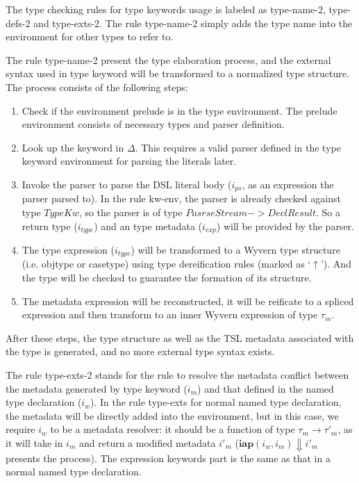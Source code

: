 \documentclass{sig-alternate}
\begin{document}
The type checking rules for type keywords usage is labeled as type-name-2, type-defs-2 and type-exts-2. The rule type-name-2 simply adds the type name into the environment for other types to refer to.

The rule type-name-2 present the type elaboration process, and the external syntax used in type keyword will be transformed to a normalized type structure. The process consists of the following steps:
\begin{enumerate}\setlength{\itemsep}{0pt}
\item Check if the environment prelude is in the type environment. The prelude environment consists of necessary types and parser definition. 
\item Look up the keyword in $\Delta$. This requires a valid parser defined in the type keyword environment for parsing the literals later.
\item Invoke the parser to parse the DSL literal body ($i_{ps}$, as an expression the parser parsed to). In the rule kw-env, the parser is already checked against type $TypeKw$, so the parser is of type $PasrseStream->DeclResult$. So a return type ($i_{type}$) and an type metadata ($i_{exp}$) will be provided by the parser.
\item The type expression ($i_{type}$) will be transformed to a Wyvern type structure (i.e. objtype or casetype) using type dereification rules (marked as `$\uparrow$'). And the type will be checked to guarantee the formation of its structure.
\item The metadata expression will be reconstructed, it will be reificate to a spliced expression and then transform to an inner Wyvern expression of type $\tau_m$. 
\end{enumerate} 
After these steps, the type structure as well as the TSL metadata associated with the type is generated, and no more external type syntax exists.

The rule type-exts-2 stands for the rule to resolve the metadata conflict between the metadata generated by type keyword ($i_m$) and that defined in the named type declaration ($i_w$). In the rule type-exts for normal named type declaration, the metadata will be directly added into the environment, but in this case, we require $i_w$ to be a metadata resolver: it should be a function of type $\tau_m\rightarrow\tau'_m$, as it will take in $i_m$ and return a modified metadata $i'_m$ ($\mathbf{iap}(i_w, i_m)\Downarrow i'_m$ presents the process). The expression keywords part is the same as that in a normal named type declaration.

\end{document}

